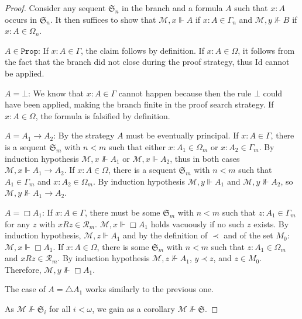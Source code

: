 \documentclass[10pt,a4paper]{amsart}
\newcommand{\Mw}{\mathcal{M}}
\newcommand{\Prop}{\mathtt{Prop}}
\newcommand{\R}{\mathcal{R}}
\newcommand{\Seq}{\mathfrak{S}}
\begin{document}
\begin{proof}
    Consider any sequent $\Seq_n$ in the branch and a formula $A$ such that $x:A$  occurs in $\Seq_n$. It then suffices to show that $\Mw, x \Vdash A$ if $x:A \in \Gamma_n$ and $\Mw , y \nVdash B$ if $x:A \in \Omega_n$.

    $A \in \Prop$: If $x:A \in \Gamma $, the claim follows by definition. If $x:A \in \Omega$, it follows from the fact that the branch did not close during the proof strategy, thus Id cannot be applied.

    $A=\bot$: We know that $x:A \in \Gamma$ cannot happen because then the rule $\bot$ could have been applied, making the branch finite in the proof search strategy. If $x:A \in \Omega$, the formula is falsified by definition.

    \sloppy
    $A= A_1 \to A_2$: By the strategy $A$ must be eventually principal. 
    If ${x:A \in \Gamma}$, there is a sequent $\Seq_m$ with ${n < m}$ such that either ${x: A_1 \in \Omega_m}$ or ${x:A_2 \in \Gamma_m}$.
    By induction hypothesis $\Mw , x \nVdash A_1$ or $\Mw , x \Vdash A_2$, thus in both cases ${\Mw , x\Vdash A_1 \to A_2}$. 
    If $x:A \in \Omega$, there is a sequent $\Seq_m$ with $n < m$ such that $A_1 \in \Gamma_m$ and $x: A_2 \in \Omega_m$. By induction hypothesis $\Mw , y \Vdash A_1$ and $\Mw ,y \nVdash A_2$, so $\Mw ,y \nVdash A_1 \to A_2$.
    
    $A = \Box A_1$: If $x:A \in \Gamma$, there must be some $\Seq_m$ with $n < m$ such that $z : A_1 \in \Gamma_m$ for any $z$ with $xR z \in \R_m$. $\Mw, x \Vdash \Box A_1$ holds vacuously if no such $z$ exists. By induction hypothesis, $\Mw , z \Vdash A_1$ and by the definition of $\prec$ and of the set $M_0$: $\Mw , x \Vdash \Box A_1$.
    If $x:A \in \Omega$, there is some $\Seq_m$ with $n < m$ such that $z : A_1 \in \Omega_m$ and $xRz \in \R_m$. By induction hypothesis $\Mw , z \nVdash A_1$, $y \prec z$, and $z \in M_0$. Therefore, $\Mw , y \nVdash \Box A_1$.
    
    The case of $A = \triangle A_1$ works similarly to the previous one. 

    As $\Mw \nVdash \Seq_i$ for all $i < \omega$, we gain as a corollary $\Mw \nVdash \Seq$.  
\end{proof}
\end{document}
